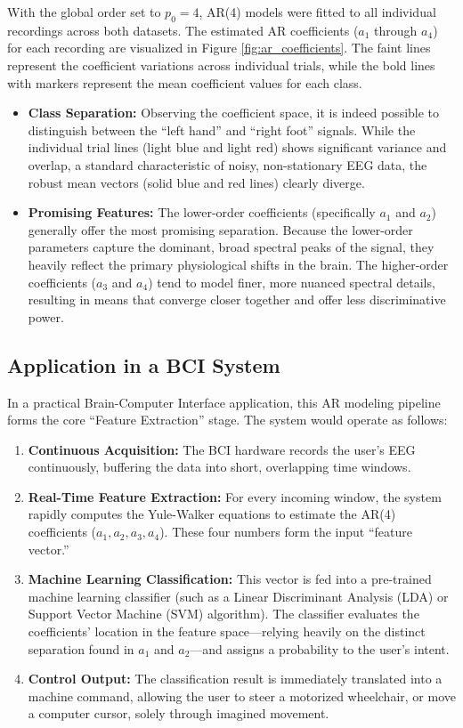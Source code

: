 \documentclass[11pt,a4paper]{article}
\begin{document}
With the global order set to $p_0 = 4$, AR(4) models were fitted to all individual recordings across both datasets. The estimated AR coefficients ($a_1$ through $a_4$) for each recording are visualized in Figure \ref{fig:ar_coefficients}. The faint lines represent the coefficient variations across individual trials, while the bold lines with markers represent the mean coefficient values for each class.

\begin{itemize}
    \item \textbf{Class Separation:} Observing the coefficient space, it is indeed possible to distinguish between the ``left hand'' and ``right foot'' signals. While the individual trial lines (light blue and light red) shows significant variance and overlap, a standard characteristic of noisy, non-stationary EEG data, the robust mean vectors (solid blue and red lines) clearly diverge.
    \item \textbf{Promising Features:} The lower-order coefficients (specifically $a_1$ and $a_2$) generally offer the most promising separation. Because the lower-order parameters capture the dominant, broad spectral peaks of the signal, they heavily reflect the primary physiological shifts in the brain. The higher-order coefficients ($a_3$ and $a_4$) tend to model finer, more nuanced spectral details, resulting in means that converge closer together and offer less discriminative power.
\end{itemize}

\subsection{Application in a BCI System}
In a practical Brain-Computer Interface application, this AR modeling pipeline forms the core ``Feature Extraction'' stage. The system would operate as follows:

\begin{enumerate}
    \item \textbf{Continuous Acquisition:} The BCI hardware records the user's EEG continuously, buffering the data into short, overlapping time windows.
    \item \textbf{Real-Time Feature Extraction:} For every incoming window, the system rapidly computes the Yule-Walker equations to estimate the AR(4) coefficients ($a_1, a_2, a_3, a_4$). These four numbers form the input ``feature vector.''
    \item \textbf{Machine Learning Classification:} This vector is fed into a pre-trained machine learning classifier (such as a Linear Discriminant Analysis (LDA) or Support Vector Machine (SVM) algorithm). The classifier evaluates the coefficients' location in the feature space---relying heavily on the distinct separation found in $a_1$ and $a_2$---and assigns a probability to the user's intent.
    \item \textbf{Control Output:} The classification result is immediately translated into a machine command, allowing the user to steer a motorized wheelchair, or move a computer cursor, solely through imagined movement.
\end{enumerate}
\end{document}
